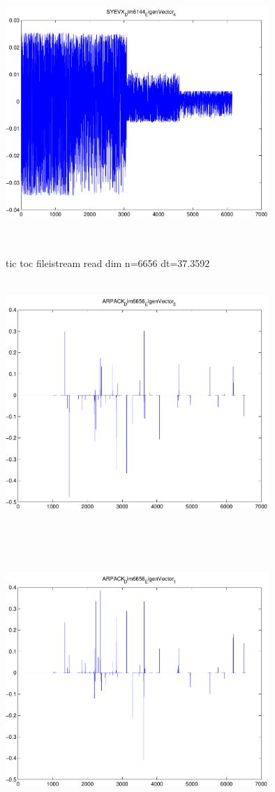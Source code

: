 \documentclass[9pt]{article}
\theoremstyle{plain}
\theoremstyle{definition}
\theoremstyle{remark}
\numberwithin{equation}{section}
\begin{document}
\includegraphics[width=10.0cm,height=10.0cm]{SYEVX_Dim6144_EigenVector_4.pdf}

tic toc fileistream read dim n=6656 dt=37.3592
\includegraphics[width=10.0cm,height=10.0cm]{ARPACK_Dim6656_EigenVector_0.pdf}

\includegraphics[width=10.0cm,height=10.0cm]{ARPACK_Dim6656_EigenVector_1.pdf}
\end{document}
